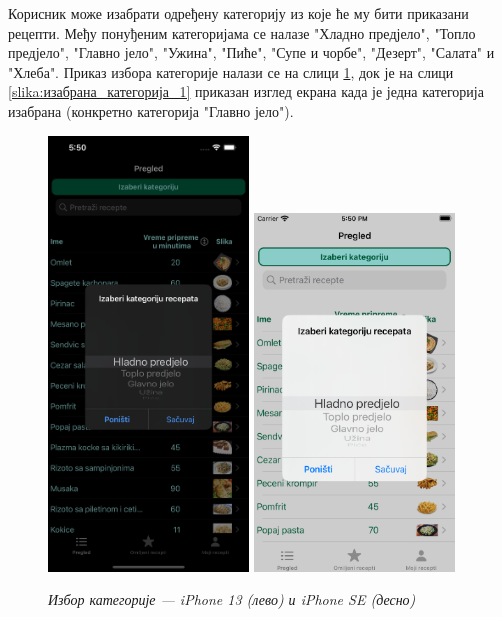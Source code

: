 \documentclass[12pt,oneside]{memoir}
\begin{document}
\indent Корисник може изабрати одређену категорију из које ће му бити приказани рецепти. Међу понуђеним категоријама се налазе "Хладно предјело", "Топло предјело", "Главно јело", "Ужина", "Пиће", "Супе и чорбе", "Дезерт", "Салата" и "Хлеба". Приказ избора категорије налази се на слици \ref{slika:категорија_1}, док је на слици \ref{slika:изабрана_категорија_1} приказан изглед екрана када је једна категорија изабрана (конкретно категорија "Главно јело").

\begin{figure} [H]
    \centering
    \captionsetup{justification=centering}
    \includegraphics[width=0.475\textwidth]{images/simulators/view images/dark - category.png} 
    \hfill
    \includegraphics[width=0.475\textwidth]{images/simulators/view images/light - category.png}
    \caption{\textit{Избор категорије --- iPhone 13 (лево) и iPhone SE (десно)}}
    \label{slika:категорија_1}
\end{figure}
\end{document}
